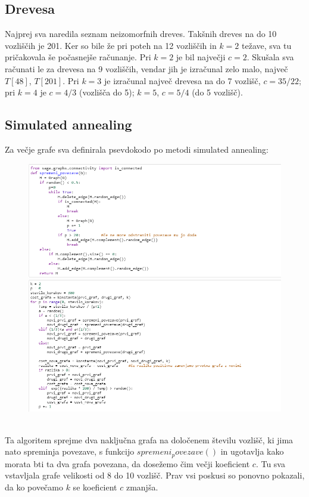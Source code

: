 \documentclass[12pt, a4paper]{article}
\begin{document}
\subsection{Drevesa}
Najprej sva naredila seznam neizomorfnih dreves. Takšnih dreves na do 10 vozliščih je 201. Ker so bile že pri poteh na 12 vozliščih in $k=2$ težave, sva tu pričakovala še počasnejše računanje. Pri $k=2$ je bil največji $c=2$. Skušala sva računati le za drevesa na 9 vozliščih, vendar jih je izračunal zelo malo, največ $T[48]$, $T[201]$. Pri $k=3$ je izračunal največ drevesa na do 7 vozlišč, $c=35/22$; pri $k=4$ je $c=4/3$ (vozlišča do 5); $k=5$, $c=5/4$ (do 5 vozlišč). \\
\pagebreak

\subsection{Simulated annealing}
Za večje grafe sva definirala psevdokodo po metodi simulated annealing:
\begin{figure}[h!]
\centering
\includegraphics[width=13.5cm]{slika_2}
\includegraphics[width=13.5cm]{slika_3}
\end{figure} \\
Ta algoritem sprejme dva naključna grafa na določenem številu vozlišč, ki jima nato spreminja povezave, s funkcijo $spremeni_povezave()$ in ugotavlja kako morata bti ta dva grafa povezana, da dosežemo čim večji koeficient $c$. Tu sva vstavljala grafe velikosti od 8 do 10 vozlišč. Prav vsi poskusi so ponovno pokazali, da ko povečamo $k$ se koeficient $c$ zmanjša.
\end{document}
